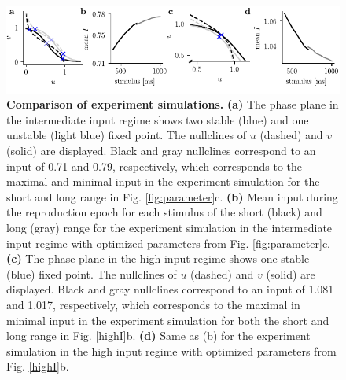 \documentclass[10pt]{article}
\begin{document}
\begin{figure}[!htb]
	\centering
	\includegraphics{figures/supp_comparison.pdf}
	\caption{\textbf{Comparison of experiment simulations.}
	\textbf{(a)} The phase plane in the intermediate input regime shows two stable (blue) and one unstable (light blue) fixed point. The nullclines of $u$ (dashed) and $v$ (solid) are displayed. Black and gray nullclines correspond to an input of 0.71 and 0.79, respectively, which corresponds to the maximal and minimal input in the experiment simulation for the short and long range in Fig. \ref{fig:parameter}c.
	\textbf{(b)} Mean input during the reproduction epoch for each stimulus of the short (black) and long (gray) range for the experiment simulation in the intermediate input regime with optimized parameters from Fig. \ref{fig:parameter}c.
	\textbf{(c)} The phase plane in the high input regime shows one stable (blue) fixed point. The nullclines of $u$ (dashed) and $v$ (solid) are displayed. Black and gray nullclines correspond to an input of 1.081 and 1.017, respectively, which corresponds to the maximal in minimal input in the experiment simulation for both the short and long range in Fig. \ref{highI}b.
	\textbf{(d)} Same as (b) for the experiment simulation in the high input regime with optimized parameters from Fig. \ref{highI}b.
	}
\label{fig:comparison}
\end{figure}
\end{document}
